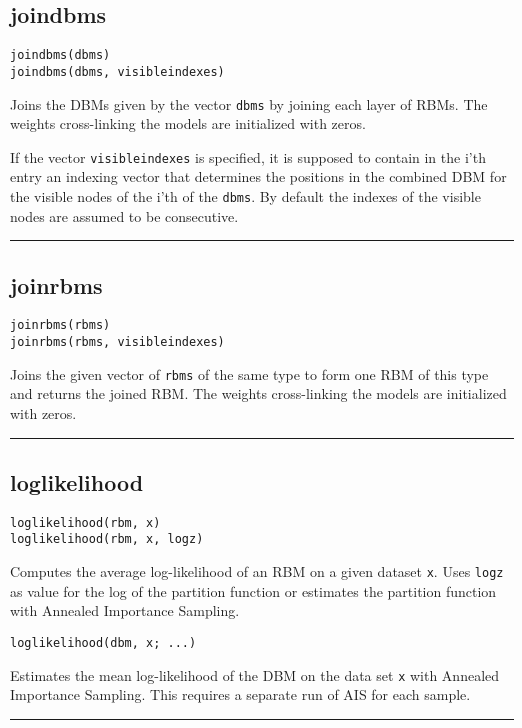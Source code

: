 \subsection*{joindbms}
\begin{verbatim}
joindbms(dbms)
joindbms(dbms, visibleindexes)
\end{verbatim}
Joins the DBMs given by the vector \texttt{dbms} by joining each layer of RBMs. The weights cross-linking the models are initialized with zeros.

If the vector \texttt{visibleindexes} is specified, it is supposed to contain in the i'th entry an indexing vector that determines the positions in the combined DBM for the visible nodes of the i'th of the \texttt{dbms}. By default the indexes of the visible nodes are assumed to be consecutive.

\noindent\rule{\textwidth}{1pt}
\subsection*{joinrbms}
\begin{verbatim}
joinrbms(rbms)
joinrbms(rbms, visibleindexes)
\end{verbatim}
Joins the given vector of \texttt{rbms} of the same type to form one RBM of this type and returns the joined RBM. The weights cross-linking the models are initialized with zeros.

\noindent\rule{\textwidth}{1pt}
\subsection*{loglikelihood}
\begin{verbatim}
loglikelihood(rbm, x)
loglikelihood(rbm, x, logz)
\end{verbatim}
Computes the average log-likelihood of an RBM on a given dataset \texttt{x}. Uses \texttt{logz} as value for the log of the partition function or estimates the partition function with Annealed Importance Sampling.

\begin{verbatim}
loglikelihood(dbm, x; ...)
\end{verbatim}
Estimates the mean log-likelihood of the DBM on the data set \texttt{x} with Annealed Importance Sampling. This requires a separate run of AIS for each sample.

\noindent\rule{\textwidth}{1pt}

